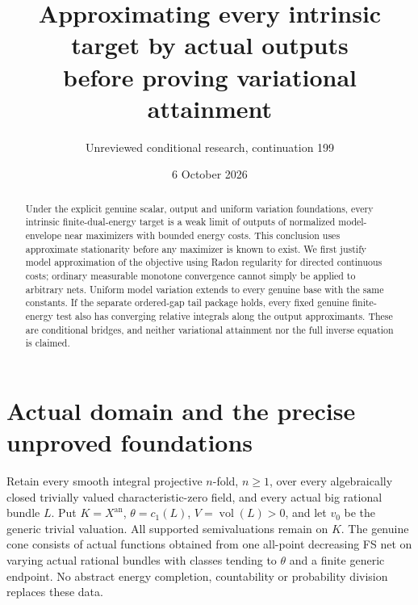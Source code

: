 \documentclass[11pt]{article}
\title{Approximating every intrinsic target by actual outputs\protect\\
before proving variational attainment}
\author{Unreviewed conditional research, continuation 199}
\date{6 October 2026}
\begin{document}
\maketitle
\begin{abstract}
Under the explicit genuine scalar, output and uniform variation
foundations, every intrinsic finite-dual-energy target is a weak limit
of outputs of normalized model-envelope near maximizers with bounded
energy costs. This conclusion uses approximate stationarity before
any maximizer is known to exist. We first justify model approximation
of the objective using Radon regularity for directed continuous costs;
ordinary measurable monotone convergence cannot simply be applied
to arbitrary nets. Uniform model variation extends to every genuine
base with the same constants. If the separate ordered-gap tail package
holds, every fixed genuine finite-energy test also has converging
relative integrals along the output approximants. These are conditional
bridges, and neither variational attainment nor the full inverse
equation is claimed.
\end{abstract}

\section{Actual domain and the precise unproved foundations}
Retain every smooth integral projective $n$-fold, $n\geq1$, over every
algebraically closed trivially valued characteristic-zero field, and
every actual big rational bundle $L$. Put $K=X^{\mathrm{an}}$,
$\theta=c_1(L)$, $V=\operatorname{vol}(L)>0$, and let $v_0$ be the
generic trivial valuation. All supported semivaluations remain on $K$.
The genuine cone consists of actual functions obtained from one
all-point decreasing FS net on varying actual rational bundles with
classes tending to $\theta$ and a finite generic endpoint.
No abstract energy completion, countability or probability division
replaces these data.
\end{document}
